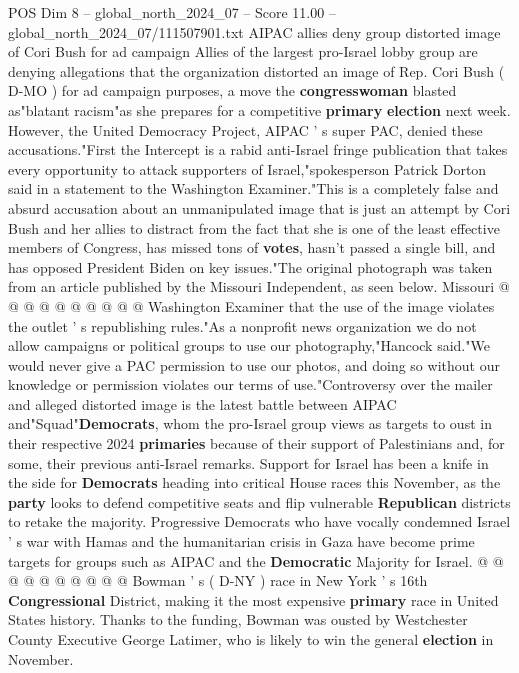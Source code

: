 \begin{textsample}{POS Dim 8 – global\_north\_2024\_07 – Score 11.00 – global\_north\_2024\_07/111507901.txt}  \label{ex:f8_pos_046}
AIPAC allies deny group distorted image of Cori Bush for ad campaign Allies of the largest pro-Israel lobby group are denying allegations that the organization distorted an image of Rep.
Cori Bush ( D-MO ) for ad campaign purposes, a move the \textbf{congresswoman} blasted as"blatant racism"as she prepares for a competitive \textbf{primary} \textbf{election} next week.
However, the United Democracy Project, AIPAC ' s super PAC, denied these accusations."First the Intercept is a rabid anti-Israel fringe publication that takes every opportunity to attack supporters of Israel,"spokesperson Patrick Dorton said in a statement to the Washington Examiner."This is a completely false and absurd accusation about an unmanipulated image that is just an attempt by Cori Bush and her allies to distract from the fact that she is one of the least effective members of Congress, has missed tons of \textbf{votes}, hasn't passed a single bill, and has opposed President Biden on key issues."The original photograph was taken from an article published by the Missouri Independent, as seen below.
Missouri @ @ @ @ @ @ @ @ @ @ Washington Examiner that the use of the image violates the outlet ' s republishing rules."As a nonprofit news organization we do not allow campaigns or political groups to use our photography,"Hancock said."We would never give a PAC permission to use our photos, and doing so without our knowledge or permission violates our terms of use."Controversy over the mailer and alleged distorted image is the latest battle between AIPAC and"Squad"\textbf{Democrats}, whom the pro-Israel group views as targets to oust in their respective 2024 \textbf{primaries} because of their support of Palestinians and, for some, their previous anti-Israel remarks.
Support for Israel has been a knife in the side for \textbf{Democrats} heading into critical House races this November, as the \textbf{party} looks to defend competitive seats and flip vulnerable \textbf{Republican} districts to retake the majority.
Progressive Democrats who have vocally condemned Israel ' s war with Hamas and the humanitarian crisis in Gaza have become prime targets for groups such as AIPAC and the \textbf{Democratic} Majority for Israel. @ @ @ @ @ @ @ @ @ @ Bowman ' s ( D-NY ) race in New York ' s 16th \textbf{Congressional} District, making it the most expensive \textbf{primary} race in United States history.
Thanks to the funding, Bowman was ousted by Westchester County Executive George Latimer, who is likely to win the general \textbf{election} in November.

\end{textsample}
